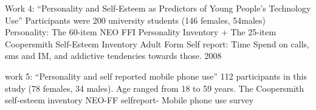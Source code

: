 {\par
Work 4: "`Personality and Self-Esteem as Predictors of Young People’s Technology Use"'
Participants were 200 university students (146 females, 54males)
Personality: The 60-item NEO FFI Personality Inventory + The 25-item Coopersmith Self-Esteem Inventory Adult Form
Self report: Time Spend on calls, sms and IM, and addictive tendencies towards those. 
2008

\par
work 5: "`Personality and self reported mobile phone use"'
112 participants in this study (78 females, 34 males). Age ranged from 18 to 59 years.
The Coopersmith self-esteem inventory
NEO-FF
selfreport- Mobile phone use survey}



